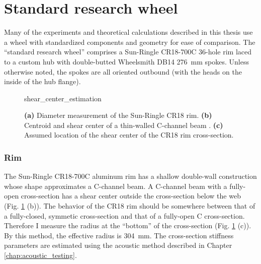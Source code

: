 \documentclass[../../thesis.tex]{subfiles}
\begin{document}
\section{Standard research wheel}
\label{app:std_research_wheel}

Many of the experiments and theoretical calculations described in this thesis use a wheel with standardized components and geometry for ease of comparison. The ``standard research wheel'' comprises a Sun-Ringle CR18-700C 36-hole rim laced to a custom hub with double-butted Wheelsmith DB14 \SI{276}{mm} spokes. Unless otherwise noted, the spokes are all oriented outbound (with the heads on the inside of the hub flange).

\begin{figure}[h]
\centering
{shear_center_estimation}
\caption[Diameter measurement of CR18 rim]{\textbf{(a)} Diameter measurement of the Sun-Ringle CR18 rim. \textbf{(b)} Centroid and shear center of a thin-walled C-channel beam \cite{Timoshenko1961}. \textbf{(c)} Assumed location of the shear center of the CR18 rim cross-section.}
\label{fig:shear_center_estimation}
\end{figure}

\subsubsection*{Rim}

The Sun-Ringle CR18-700C aluminum rim has a shallow double-wall construction whose shape approximates a C-channel beam. A C-channel beam with a fully-open cross-section has a shear center outside the cross-section below the web \cite{Timoshenko1961} (Fig. \ref{fig:shear_center_estimation} (b)). The behavior of the CR18 rim should be somewhere between that of a fully-closed, symmetic cross-section and that of a fully-open C cross-section. Therefore I measure the radius at the ``bottom'' of the cross-section (Fig. \ref{fig:shear_center_estimation} (c)). By this method, the effective radius is \SI{304}{mm}. The cross-section stiffness parameters are estimated using the acoustic method described in Chapter \ref{chap:acoustic_testing}.
\end{document}
